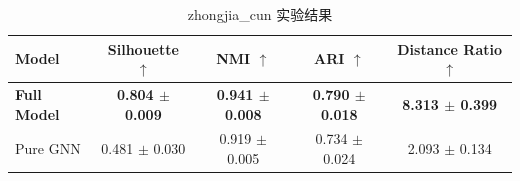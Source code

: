 \begin{table}[htbp]
  \centering
  \caption{zhongjia_cun 实验结果}
  \label{tab:zhongjia_cun_results}
  \begin{tabular}{lcccc}
    \toprule
    Model & Silhouette $\uparrow$ & NMI $\uparrow$ & ARI $\uparrow$ & Distance Ratio $\uparrow$ \\
    \midrule
    \textbf{Full Model} & \textbf{0.804 $\pm$ 0.009} & \textbf{0.941 $\pm$ 0.008} & \textbf{0.790 $\pm$ 0.018} & \textbf{8.313 $\pm$ 0.399} \\
    Pure GNN & 0.481 $\pm$ 0.030 & 0.919 $\pm$ 0.005 & 0.734 $\pm$ 0.024 & 2.093 $\pm$ 0.134 \\
    \bottomrule
  \end{tabular}
\end{table}